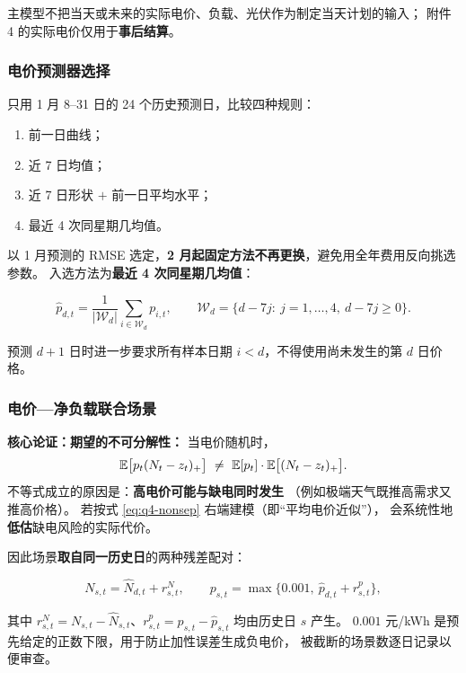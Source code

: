 主模型不把当天或未来的实际电价、负载、光伏作为制定当天计划的输入；
附件 4 的实际电价仅用于\textbf{事后结算}。

\subsubsection{电价预测器选择}

只用 1 月 8--31 日的 24 个历史预测日，比较四种规则：

\begin{enumerate}[itemsep=2pt,topsep=3pt]
  \item 前一日曲线；
  \item 近 7 日均值；
  \item 近 7 日形状 $+$ 前一日平均水平；
  \item 最近 4 次同星期几均值。
\end{enumerate}

以 1 月预测的 RMSE 选定，\textbf{2 月起固定方法不再更换}，避免用全年费用反向挑选参数。
入选方法为\textbf{最近 4 次同星期几均值}：

\begin{equation}
\hat p_{d,t}=\frac{1}{|\mathcal W_d|}\sum_{i\in\mathcal W_d}p_{i,t},
\qquad \mathcal W_d=\{d-7j:\ j=1,\dots,4,\ d-7j\ge0\}.
\end{equation}

预测 $d+1$ 日时进一步要求所有样本日期 $i<d$，不得使用尚未发生的第 $d$ 日价格。

\subsubsection{电价—净负载联合场景}

\textbf{核心论证：期望的不可分解性：}
当电价随机时，
\begin{equation}
\E\bigl[p_t(N_t-z_t)_+\bigr]\ \neq\ \E[p_t]\cdot\E\bigl[(N_t-z_t)_+\bigr].
\label{eq:q4-nonsep}
\end{equation}
不等式成立的原因是：\textbf{高电价可能与缺电同时发生}
（例如极端天气既推高需求又推高价格）。
若按式 \eqref{eq:q4-nonsep} 右端建模（即“平均电价近似”），
会系统性地\textbf{低估}缺电风险的实际代价。

因此场景\textbf{取自同一历史日}的两种残差配对：

\begin{equation}
N_{s,t}=\hat N_{d,t}+r^N_{s,t},\qquad
p_{s,t}=\max\bigl\{0.001,\ \hat p_{d,t}+r^p_{s,t}\bigr\},
\label{eq:q4-scen}
\end{equation}

其中 $r^N_{s,t}=N_{s,t}-\hat N_{s,t}$、$r^p_{s,t}=p_{s,t}-\hat p_{s,t}$ 均由历史日 $s$ 产生。
$0.001$ 元/kWh 是预先给定的正数下限，用于防止加性误差生成负电价，
被截断的场景数逐日记录以便审查。


